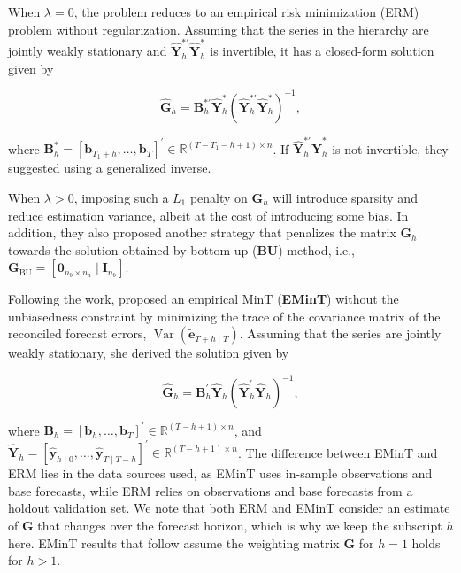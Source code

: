 \documentclass[11pt,a4paper,]{article}
\begin{document}
When \(\lambda = 0\), the problem reduces to an empirical risk
minimization (ERM) problem without regularization. Assuming that the
series in the hierarchy are jointly weakly stationary and
\(\hat{\boldsymbol{Y}}_{h}^{*\prime}\hat{\boldsymbol{Y}}_{h}^{*}\) is
invertible, it has a closed-form solution given by

\[
\hat{\boldsymbol{G}}_h = \boldsymbol{B}_{h}^{*\prime}\hat{\boldsymbol{Y}}_{h}^{*}\left(\hat{\boldsymbol{Y}}_{h}^{*\prime}\hat{\boldsymbol{Y}}_{h}^{*}\right)^{-1},
\]

where
\(\boldsymbol{B}_{h}^{*}=\left[\boldsymbol{b}_{T_1+h}, \ldots, \boldsymbol{b}_T\right]^{\prime} \in \mathbb{R}^{\left(T-T_1-h+1\right) \times n}\).
If \(\hat{\boldsymbol{Y}}_{h}^{*\prime}\hat{\boldsymbol{Y}}_{h}^{*}\) is
not invertible, they suggested using a generalized inverse.

When \(\lambda > 0\), imposing such a \(L_1\) penalty on
\(\boldsymbol{G}_h\) will introduce sparsity and reduce estimation
variance, albeit at the cost of introducing some bias. In addition, they
also proposed another strategy that penalizes the matrix
\(\boldsymbol{G}_h\) towards the solution obtained by bottom-up
(\textbf{BU}) method, i.e.,
\(\boldsymbol{G}_{\text{BU}} = \left[\boldsymbol{0}_{n_b \times n_a} \mid \boldsymbol{I}_{n_b}\right]\).

Following the work, \textcite{Wickramasuriya2021-am} proposed an
empirical MinT (\textbf{EMinT}) without the unbiasedness constraint by
minimizing the trace of the covariance matrix of the reconciled forecast
errors, \(\operatorname{Var}(\tilde{\boldsymbol{e}}_{T+h \mid T})\).
Assuming that the series are jointly weakly stationary, she derived the
solution given by

\[
\hat{\boldsymbol{G}}_{h} = \boldsymbol{B}_{h}^{\prime}\hat{\boldsymbol{Y}}_{h}\left(\hat{\boldsymbol{Y}}_{h}^{\prime}\hat{\boldsymbol{Y}}_{h}\right)^{-1},
\]

where
\(\boldsymbol{B}_{h}=\left[\boldsymbol{b}_{h}, \ldots, \boldsymbol{b}_T\right]^{\prime} \in \mathbb{R}^{\left(T-h+1\right) \times n}\),
and
\(\hat{\boldsymbol{Y}}_{h}=\left[\hat{\boldsymbol{y}}_{h \mid 0}, \ldots, \hat{\boldsymbol{y}}_{T \mid T-h}\right]^{\prime} \in \mathbb{R}^{\left(T-h+1\right) \times n}\).
The difference between EMinT and ERM lies in the data sources used, as
EMinT uses in-sample observations and base forecasts, while ERM relies
on observations and base forecasts from a holdout validation set. We
note that both ERM and EMinT consider an estimate of \(\boldsymbol{G}\)
that changes over the forecast horizon, which is why we keep the
subscript \(h\) here. EMinT results that follow assume the weighting
matrix \(\boldsymbol{G}\) for \(h=1\) holds for \(h>1\).
\end{document}
